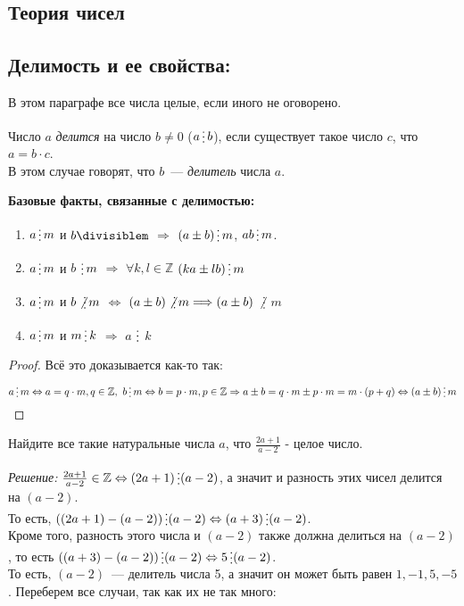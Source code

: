 \documentclass[11pt]{article}
\begin{document}
\begin{center}
\section{Теория чисел}
\end{center}
\subsection{Делимость и ее свойства:}

В этом параграфе все числа целые, если иного не оговорено.
\begin{definition}
    Число $a$ \emph{делится} на число $b \neq 0$ ($a \divisible b$), если существует такое число $c$, что $a = b \cdot c$.\\
	В этом случае говорят, что $b$~--- \emph{делитель} числа $a$.
\end{definition}

\textbf{Базовые факты, связанные с делимостью:}
\begin{enumerate}
	\item $a \divisible m$ и $b \divisiblem$ $\Longrightarrow$ $(a \pm b) \divisible m$, $ab \divisible m$.
	\item $a \divisible m$  и $b$ $\divisible m$ $\Longrightarrow$ $\forall k, l \in \mathbb{Z} $ $(ka \pm lb) \divisible m$
	\item $a \divisible m$ и $b \not\divisible m$  $\Leftrightarrow$ $(a \pm b) \not\divisible m \Longrightarrow (a \pm b)$ $\not\divisible$ $m$
	\item $a \divisible m$ и $m \divisible k$ $\Longrightarrow$ $a$ $\divisible$ $k$
\end{enumerate}
\begin{proof} Всё это доказывается как-то так:
	\[a \divisible m \Leftrightarrow a = q \cdot m, q \in \mathbb{Z}, \ b \divisible m \Leftrightarrow b = p \cdot m, p \in \mathbb{Z} \Rightarrow a \pm b = q \cdot m \pm p \cdot m = m \cdot (p + q) \Leftrightarrow (a \pm b) \divisible m\]


\end{proof}

\begin{example}
Найдите все такие натуральные числа $a$, что $\frac{2a + 1}{a - 2}$ - целое число.
\end{example}
\textit{Решение:}
\noindent$\frac{2a + 1}{a - 2} \in \mathbb{Z} \Leftrightarrow (2a + 1) \divisible (a - 2)$, а значит и разность этих чисел делится на $(a - 2)$.\\
То есть, $((2a + 1) - (a - 2)) \divisible (a - 2) \Leftrightarrow (a + 3) \divisible (a - 2)$.\\
 Кроме того, разность этого числа и $(a - 2)$ также должна делиться на  $(a - 2)$, то есть $((a + 3) - (a - 2)) \divisible (a - 2) \Leftrightarrow 5 \divisible (a - 2)$.\\
То есть, $(a - 2)$~--- делитель числа 5, а значит он может быть равен $1, -1, 5, -5$. Переберем все случаи, так как их не так много:
\end{document}
